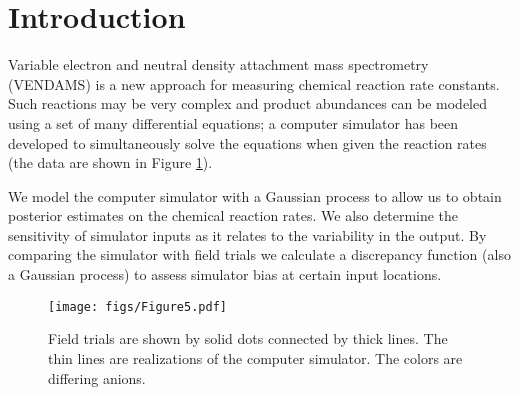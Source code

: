 \section{Introduction}

Variable electron and neutral density attachment mass spectrometry (VENDAMS) is a new approach for measuring chemical reaction rate constants. Such reactions may be very complex and product abundances can be modeled using a set of many differential equations; a computer simulator has been developed to simultaneously solve the equations when given the reaction rates (the data are shown in Figure \ref{data}). 

We model the computer simulator with a Gaussian process to allow us to obtain posterior estimates on the chemical reaction rates. We also determine the sensitivity of simulator inputs as it relates to the variability in the output. By comparing the simulator with field trials we calculate a discrepancy function (also a Gaussian process) to assess simulator bias at certain input locations.

\begin{figure}[H]
\begin{center}
\texttt{[image: figs/Figure5.pdf]}
\end{center}
\caption{Field trials are shown by solid dots connected by thick lines. The thin lines are realizations of the computer simulator. The colors are differing anions.}
\label{data}
\end{figure}
